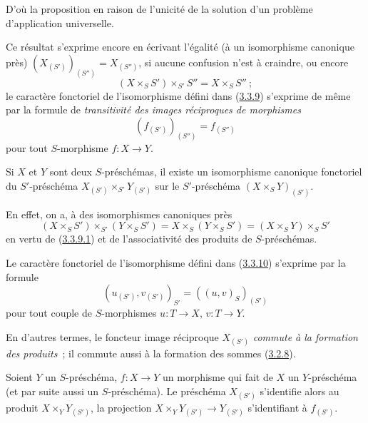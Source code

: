 D'où la proposition en raison de l'unicité de la solution d'un problème
d'application universelle.

Ce résultat s'exprime encore en écrivant l'égalité (à un isomorphisme
canonique près) $(X_{(S')})_{(S'')}=X_{(S'')}$, si aucune confusion n'est à
craindre, ou encore
\begin{equation}
  (X\times_S S')\times_{S'}S''=X\times_S S''~;
  \tag{3.3.9.1}\label{I.3.3.9.1-fr}
\end{equation}
le caractère fonctoriel de l'isomorphisme défini dans
(\hyperref[I.3.3.9-fr]{3.3.9}) s'exprime de même par la formule de
\emph{transitivité des images réciproques de morphismes}
\begin{equation}
  (f_{(S')})_{(S'')}=f_{(S'')}
  \tag{3.3.9.2}\label{I.3.3.9.2-fr}
\end{equation}
pour tout $S$-morphisme $f:X\to Y$.

\begin{corollary}[3.3.10]
\label{I.3.3.10-fr}
Si $X$ et $Y$ sont deux $S$-préschémas, il existe un isomorphisme canonique
fonctoriel du $S'$-préschéma $X_{(S')}\times_{S'}Y_{(S')}$ sur le
$S'$-préschéma $(X\times_S Y)_{(S')}$.
\end{corollary}

En effet, on a, à des isomorphismes canoniques près
\[
  (X\times_S S')\times_{S'}(Y\times_S S')
  =X\times_S(Y\times_S S')=(X\times_S Y)\times_S S'
\]
en vertu de (\hyperref[I.3.3.9.1-fr]{3.3.9.1}) et de l'associativité des
produits de $S$-préschémas.

Le caractère fonctoriel de l'isomorphisme défini dans
(\hyperref[I.3.3.10-fr]{3.3.10}) s'exprime par la formule
\begin{equation}
  (u_{(S')},v_{(S')})_{S'}=((u,v)_S)_{(S')}
  \tag{3.3.10.1}\label{I.3.3.10.1-fr}
\end{equation}
pour tout couple de $S$-morphismes $u:T\to X$, $v:T\to Y$.

En d'autres termes, le foncteur image réciproque $X_{(S')}$
\emph{commute à la formation des produits}~; il commute aussi à la formation
des sommes (\hyperref[I.3.2.8-fr]{3.2.8}).

\begin{corollary}[3.3.11]
\label{I.3.3.11-fr}
Soient $Y$ un $S$-préschéma, $f:X\to Y$ un morphisme qui fait de $X$ un
$Y$-préschéma (et par suite aussi un $S$-préschéma). Le préschéma $X_{(S')}$
s'identifie alors au produit $X\times_Y Y_{(S')}$, la projection
$X\times_Y Y_{(S')}\to Y_{(S')}$ s'identifiant à $f_{(S')}$.
\end{corollary}

